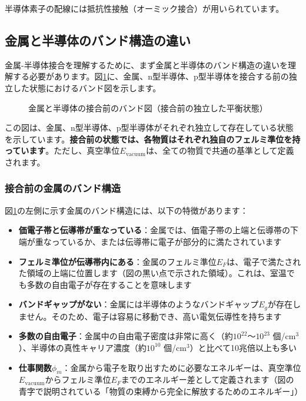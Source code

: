 半導体素子の配線には抵抗性接触（オーミック接合）が用いられています。

\subsection{金属と半導体のバンド構造の違い}

金属-半導体接合を理解するために、まず金属と半導体のバンド構造の違いを理解する必要があります。図\ref{fig:metal_semiconductor_band}に、金属、n型半導体、p型半導体を接合する前の独立した状態におけるバンド図を示します。

\begin{figure}[H]
\centering
{}
\caption{金属と半導体の接合前のバンド図（接合前の独立した平衡状態）}
\label{fig:metal_semiconductor_band}
\end{figure}

この図は、金属、n型半導体、p型半導体がそれぞれ独立して存在している状態を示しています。\textbf{接合前の状態では、各物質はそれぞれ独自のフェルミ準位を持っています}。ただし、真空準位$E_{\text{vacuum}}$は、全ての物質で共通の基準として定義されます。

\subsubsection{接合前の金属のバンド構造}

図\ref{fig:metal_semiconductor_band}の左側に示す金属のバンド構造には、以下の特徴があります：

\begin{itemize}
\item \textbf{価電子帯と伝導帯が重なっている}：金属では、価電子帯の上端と伝導帯の下端が重なっているか、または伝導帯に電子が部分的に満たされています

\item \textbf{フェルミ準位が伝導帯内にある}：金属のフェルミ準位$E_F$は、電子で満たされた領域の上端に位置します（図の黒い点で示された領域）。これは、室温でも多数の自由電子が存在することを意味します

\item \textbf{バンドギャップがない}：金属には半導体のようなバンドギャップ$E_g$が存在しません。そのため、電子は容易に移動でき、高い電気伝導性を持ちます

\item \textbf{多数の自由電子}：金属中の自由電子密度は非常に高く（約$10^{22}$〜$10^{23}$ 個/cm$^3$）、半導体の真性キャリア濃度（約$10^{10}$ 個/cm$^3$）と比べて10兆倍以上も多い

\item \textbf{仕事関数$\phi_m$}：金属から電子を取り出すために必要なエネルギーは、真空準位$E_{\text{vacuum}}$からフェルミ準位$E_F$までのエネルギー差として定義されます（図の青字で説明されている「物質の束縛から完全に解放するためのエネルギー」）
\end{itemize}

